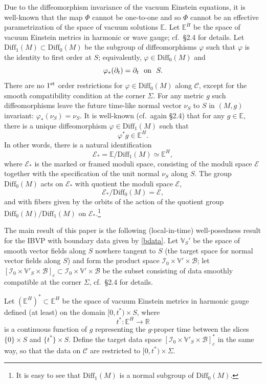 \documentclass[10pt]{amsart}
\newcommand{\f}{\varphi}
\newcommand{\Si}{\Sigma}
\newcommand{\cC}{{\mathcal C}}
\newcommand{\cB}{{\mathcal B}}
\newcommand{\cE}{{\mathcal E}}
\newcommand{\cI}{\mathcal I}
\newcommand{\bR}{\mathbb R}
\newcommand{\bE}{\mathbb E}
\newcommand{\bV}{\mathbb V}
\newcommand{\Diff}{\mathrm{Diff}}
\newcommand{\be}{\begin{equation}}
\newcommand{\ee}{\end{equation}}
\newcommand{\p}{\partial}
\renewcommand{\to}{\rightarrow}
\newcommand{\<}{\langle}
\renewcommand{\>}{\rangle}
\theoremstyle{plain}
\theoremstyle{remark}
\theoremstyle{definition}
\numberwithin{equation}{section}
\begin{document}
  Due to the diffeomorphism invariance of the vacuum Einstein equations, it is well-known that the map $\Phi$ cannot be one-to-one and so $\Phi$ 
cannot be an effective parametrization of the space of vacuum solutions $\bE$. Let $\bE^H$ be the space of vacuum Einstein metrics in harmonic or 
wave gauge; cf.~\S 2.4 for details. Let $\Diff_1(M) \subset \Diff_0(M)$ be the subgroup of diffeomorphisms $\f$ such that $\f$ is the identity to first order at $S$; 
equivalently, $\f \in \Diff_0(M)$ and 
$$\f_*(\p_t) = \p_t \ \ {\rm on} \ \ S.$$
There are no $1^{\rm st}$ order restrictions for $\f \in \Diff_0(M)$ along $\cC$, except for the smooth compatibility condition at the corner $\Si$. For any 
metric $g$ such diffeomorphisms leave the future time-like normal vector $\nu_S$ to $S$ in $(M, g)$ invariant: $\f_*(\nu_S) = \nu_S$. 
It is well-known (cf.~again \S 2.4)  that for any $g \in \bE$, there is a unique diffeomorphism $\f \in \Diff_1(M)$ such that $$\f^*g \in \bE^H.$$
In other words, there is a natural identification 
\be \label{harmslice}
\cE_* =  \bE/\Diff_1(M) \simeq \bE^H,
\ee
where $\cE_*$ is the marked or framed moduli space, consisting of the moduli space $\cE$ together with the specification of the unit normal $\nu_S$ 
along $S$. The group $\Diff_0(M)$ acts on $\cE_*$ with quotient the moduli space $\cE$,
$$\cE_*/\Diff_0(M) = \cE,$$
and with fibers given by the orbits of the action of the quotient group $\Diff_0(M) / \Diff_1(M)$ on $\cE_*$.\footnote{It is easy to see that $\Diff_1(M)$ is a 
normal subgroup of $\Diff_0(M)$. }

\medskip 

   The main result of this paper is the following (local-in-time) well-posedness result for the IBVP with boundary data given by \eqref{bdata}. 
Let $\bV_S'$ be the space of smooth vector fields along $S$ nowhere tangent to $S$ (the target space for normal vector fields along $S$) and form the 
product space $\cI_0 \times \bV' \times \cB$; let $[\cI_0 \times \bV'_S \times \cB]_c \subset \cI_0 \times \bV' \times \cB$ be the subset consisting of 
data smoothly compatible at the corner $\Si$, cf.~\S 2.4 for details. 


 Let $(\bE^H)^* \subset \bE^H$ be the space of vacuum Einstein metrics in harmonic gauge defined (at least) on the domain $[0, t^*)\times S$, 
 where 
 \be \label{tstar}
 t^*: \bE^H \to \bR
 \ee
 is a continuous function of $g$ representing the $g$-proper time between the slices $\{0\} \times S$ and $\{t^*\}\times S$. 
 Define the target data space $[\cI_0 \times \bV'_S \times \cB]_c^*$ in the same way, so that the data on $\cC$ are restricted to $[0, t^*)\times \Si$. 
\end{document}

